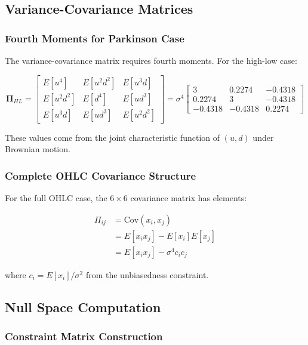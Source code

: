 \subsection{ Variance-Covariance Matrices}

\subsubsection{ Fourth Moments for Parkinson Case}

The variance-covariance matrix requires fourth moments. For the high-low case:

\begin{equation}
\boldsymbol{\Pi}_{HL} = \begin{bmatrix}
E[u^4] & E[u^2d^2] & E[u^3d] \\
E[u^2d^2] & E[d^4] & E[ud^3] \\
E[u^3d] & E[ud^3] & E[u^2d^2]
\end{bmatrix} = \sigma^4 \begin{bmatrix}
3 & 0.2274 & -0.4318 \\
0.2274 & 3 & -0.4318 \\
-0.4318 & -0.4318 & 0.2274
\end{bmatrix}
\end{equation}

These values come from the joint characteristic function of $(u, d)$ under Brownian motion.

\subsubsection{ Complete OHLC Covariance Structure}

For the full OHLC case, the $6 \times 6$ covariance matrix has elements:

\begin{align}
\Pi_{ij} &= \text{Cov}(x_i, x_j) \\
&= E[x_i x_j] - E[x_i]E[x_j] \\
&= E[x_i x_j] - \sigma^4 c_i c_j
\end{align}

where $c_i = E[x_i]/\sigma^2$ from the unbiasedness constraint.

\subsection{ Null Space Computation}

\subsubsection{ Constraint Matrix Construction}

